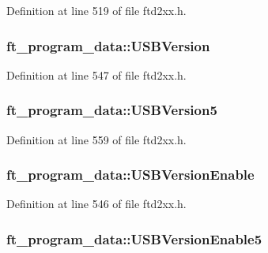 Definition at line 519 of file ftd2xx.h.\hypertarget{structft__program__data_a84fc61b75cabaf452a5f5c880d261dc6}{
\subsubsection[{USBVersion}]{ {\bf ft\_\-program\_\-data::USBVersion}}}
\label{structft__program__data_a84fc61b75cabaf452a5f5c880d261dc6}


Definition at line 547 of file ftd2xx.h.\hypertarget{structft__program__data_a0cbc74e54699448f0dcd464d057201b0}{
\subsubsection[{USBVersion5}]{ {\bf ft\_\-program\_\-data::USBVersion5}}}
\label{structft__program__data_a0cbc74e54699448f0dcd464d057201b0}


Definition at line 559 of file ftd2xx.h.\hypertarget{structft__program__data_adf5b7a284900e2dbb3d310225f85737e}{
\subsubsection[{USBVersionEnable}]{ {\bf ft\_\-program\_\-data::USBVersionEnable}}}
\label{structft__program__data_adf5b7a284900e2dbb3d310225f85737e}


Definition at line 546 of file ftd2xx.h.\hypertarget{structft__program__data_add93538aae456427d1d922891d98c97c}{
\subsubsection[{USBVersionEnable5}]{ {\bf ft\_\-program\_\-data::USBVersionEnable5}}}
\label{structft__program__data_add93538aae456427d1d922891d98c97c}



